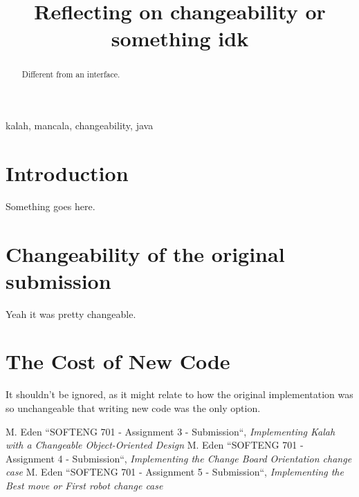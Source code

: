 \documentclass[10pt, a4paper, conference]{IEEEtran}
\begin{document}
\title{Reflecting on changeability or something idk}

\author{
}

\maketitle

\begin{abstract}
  Different from an interface.
\end{abstract}

\begin{IEEEkeywords}
kalah, mancala, changeability, java
\end{IEEEkeywords}

\section{Introduction}
Something goes here.

\section{Changeability of the original submission}
Yeah it was pretty changeable.

\section{The Cost of New Code}
It shouldn't be ignored, as it might relate to how the original implementation
was so unchangeable that writing new code was the only option.

\begin{thebibliography}{00}
   M. Eden ``SOFTENG 701 - Assignment 3 - Submission``,
    \textit{Implementing Kalah with a Changeable Object-Oriented Design}
   M. Eden ``SOFTENG 701 - Assignment 4 - Submission``,
    \textit{Implementing the Change Board Orientation change case}
   M. Eden ``SOFTENG 701 - Assignment 5 - Submission``,
    \textit{Implementing the Best move or First robot change case}
\end{thebibliography}
\end{document}

